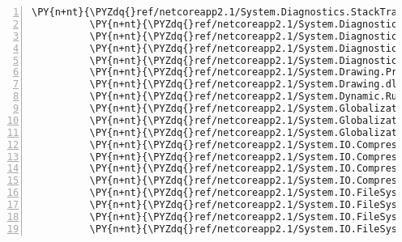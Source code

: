 \begin{Verbatim}[commandchars=\\\{\},numbers=left,firstnumber=1,stepnumber=1,numberblanklines=0]
          \PY{n+nt}{\PYZdq{}ref/netcoreapp2.1/System.Diagnostics.StackTrace.dll\PYZdq{}}\PY{p}{:} \PY{p}{\PYZob{}}\PY{p}{\PYZcb{}}\PY{p}{,}
          \PY{n+nt}{\PYZdq{}ref/netcoreapp2.1/System.Diagnostics.TextWriterTraceListener.dll\PYZdq{}}\PY{p}{:} \PY{p}{\PYZob{}}\PY{p}{\PYZcb{}}\PY{p}{,}
          \PY{n+nt}{\PYZdq{}ref/netcoreapp2.1/System.Diagnostics.Tools.dll\PYZdq{}}\PY{p}{:} \PY{p}{\PYZob{}}\PY{p}{\PYZcb{}}\PY{p}{,}
          \PY{n+nt}{\PYZdq{}ref/netcoreapp2.1/System.Diagnostics.TraceSource.dll\PYZdq{}}\PY{p}{:} \PY{p}{\PYZob{}}\PY{p}{\PYZcb{}}\PY{p}{,}
          \PY{n+nt}{\PYZdq{}ref/netcoreapp2.1/System.Diagnostics.Tracing.dll\PYZdq{}}\PY{p}{:} \PY{p}{\PYZob{}}\PY{p}{\PYZcb{}}\PY{p}{,}
          \PY{n+nt}{\PYZdq{}ref/netcoreapp2.1/System.Drawing.Primitives.dll\PYZdq{}}\PY{p}{:} \PY{p}{\PYZob{}}\PY{p}{\PYZcb{}}\PY{p}{,}
          \PY{n+nt}{\PYZdq{}ref/netcoreapp2.1/System.Drawing.dll\PYZdq{}}\PY{p}{:} \PY{p}{\PYZob{}}\PY{p}{\PYZcb{}}\PY{p}{,}
          \PY{n+nt}{\PYZdq{}ref/netcoreapp2.1/System.Dynamic.Runtime.dll\PYZdq{}}\PY{p}{:} \PY{p}{\PYZob{}}\PY{p}{\PYZcb{}}\PY{p}{,}
          \PY{n+nt}{\PYZdq{}ref/netcoreapp2.1/System.Globalization.Calendars.dll\PYZdq{}}\PY{p}{:} \PY{p}{\PYZob{}}\PY{p}{\PYZcb{}}\PY{p}{,}
          \PY{n+nt}{\PYZdq{}ref/netcoreapp2.1/System.Globalization.Extensions.dll\PYZdq{}}\PY{p}{:} \PY{p}{\PYZob{}}\PY{p}{\PYZcb{}}\PY{p}{,}
          \PY{n+nt}{\PYZdq{}ref/netcoreapp2.1/System.Globalization.dll\PYZdq{}}\PY{p}{:} \PY{p}{\PYZob{}}\PY{p}{\PYZcb{}}\PY{p}{,}
          \PY{n+nt}{\PYZdq{}ref/netcoreapp2.1/System.IO.Compression.Brotli.dll\PYZdq{}}\PY{p}{:} \PY{p}{\PYZob{}}\PY{p}{\PYZcb{}}\PY{p}{,}
          \PY{n+nt}{\PYZdq{}ref/netcoreapp2.1/System.IO.Compression.FileSystem.dll\PYZdq{}}\PY{p}{:} \PY{p}{\PYZob{}}\PY{p}{\PYZcb{}}\PY{p}{,}
          \PY{n+nt}{\PYZdq{}ref/netcoreapp2.1/System.IO.Compression.ZipFile.dll\PYZdq{}}\PY{p}{:} \PY{p}{\PYZob{}}\PY{p}{\PYZcb{}}\PY{p}{,}
          \PY{n+nt}{\PYZdq{}ref/netcoreapp2.1/System.IO.Compression.dll\PYZdq{}}\PY{p}{:} \PY{p}{\PYZob{}}\PY{p}{\PYZcb{}}\PY{p}{,}
          \PY{n+nt}{\PYZdq{}ref/netcoreapp2.1/System.IO.FileSystem.DriveInfo.dll\PYZdq{}}\PY{p}{:} \PY{p}{\PYZob{}}\PY{p}{\PYZcb{}}\PY{p}{,}
          \PY{n+nt}{\PYZdq{}ref/netcoreapp2.1/System.IO.FileSystem.Primitives.dll\PYZdq{}}\PY{p}{:} \PY{p}{\PYZob{}}\PY{p}{\PYZcb{}}\PY{p}{,}
          \PY{n+nt}{\PYZdq{}ref/netcoreapp2.1/System.IO.FileSystem.Watcher.dll\PYZdq{}}\PY{p}{:} \PY{p}{\PYZob{}}\PY{p}{\PYZcb{}}\PY{p}{,}
          \PY{n+nt}{\PYZdq{}ref/netcoreapp2.1/System.IO.FileSystem.dll\PYZdq{}}\PY{p}{:} \PY{p}{\PYZob{}}\PY{p}{\PYZcb{}}\PY{p}{,}

\end{Verbatim}
